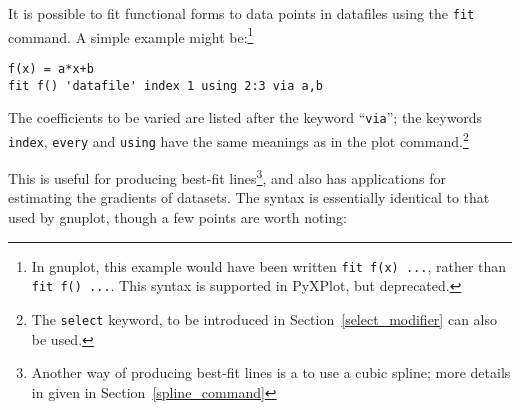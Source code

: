 \documentclass[a4paper,onecolumn,11pt]{book}
\begin{document}
It is possible to fit functional forms to data points in datafiles using the
\texttt{fit} command. A simple example might be:\footnote{In gnuplot, this example would have been written \texttt{fit f(x) ...}, rather than \texttt{fit f() ...}. This syntax is supported in PyXPlot, but deprecated.}

\begin{verbatim}
f(x) = a*x+b
fit f() 'datafile' index 1 using 2:3 via a,b
\end{verbatim}

The coefficients to be varied are listed after the keyword ``\texttt{via}'';
the keywords \texttt{index}, \texttt{every} and \texttt{using} have the same
meanings as in the plot command.\footnote{The \texttt{select} keyword, to be
introduced in Section~\ref{select_modifier} can also be used.}

This is useful for producing best-fit lines\footnote{Another way of producing best-fit lines is a to use a cubic
spline; more details in given in Section~\ref{spline_command}}, and also has
applications for estimating the gradients of datasets.  The syntax is
essentially identical to that used by gnuplot, though a few points are worth
noting:
\end{document}
